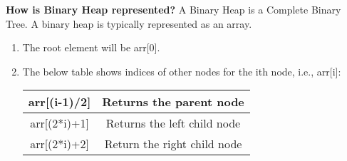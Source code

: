 \textbf{How is Binary Heap represented?}
A Binary Heap is a Complete Binary Tree. A binary heap is typically
represented as an array.
\begin{enumerate}
    \item The root element will be arr[0].
    \item The below table shows indices of other nodes for the ith node,
        i.e., arr[i]:
        \begin{center}
            \begin{tabular}{|c|c|}
                \hline
                arr[(i-1)/2] & Returns the parent node \\
                \hline
                arr[(2*i)+1] & Returns the left child node \\
                \hline
                arr[(2*i)+2] & Return the right child node \\
                \hline
            \end{tabular}
        \end{center}
\end{enumerate}
